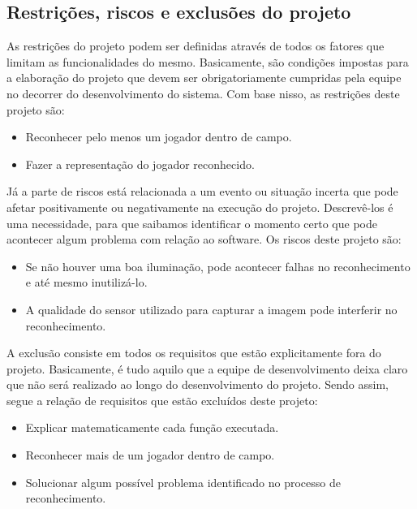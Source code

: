 \subsection{Restrições, riscos e exclusões do projeto}

As restrições do projeto podem ser definidas através de todos os fatores que limitam as funcionalidades do mesmo. Basicamente, são condições impostas para a elaboração do projeto que devem ser obrigatoriamente cumpridas pela equipe no decorrer do desenvolvimento do sistema. Com base nisso, as restrições deste projeto são:

\begin{itemize}
\raggedright \item Reconhecer pelo menos um jogador dentro de campo.
\raggedright \item Fazer a representação do jogador reconhecido.
\end{itemize}

Já a parte de riscos está relacionada a um evento ou situação incerta que pode afetar positivamente ou negativamente na execução do projeto. Descrevê-los é uma necessidade, para que saibamos identificar o momento certo que pode acontecer algum problema com relação ao software. Os riscos deste projeto são:

\begin{itemize}
\raggedright \item Se não houver uma boa iluminação, pode acontecer falhas no reconhecimento e até mesmo inutilizá-lo.
\raggedright \item A qualidade do sensor utilizado para capturar a imagem pode interferir no reconhecimento.
\end{itemize}

A exclusão consiste em todos os requisitos que estão explicitamente fora do projeto. Basicamente, é tudo aquilo que a equipe de desenvolvimento deixa claro que não será realizado ao longo do desenvolvimento do projeto. Sendo assim, segue a relação de requisitos que estão excluídos deste projeto:

\begin{itemize}
\raggedright \item Explicar matematicamente cada função executada.

\raggedright \item Reconhecer mais de um jogador dentro de campo.

\raggedright \item Solucionar algum possível problema identificado no processo de reconhecimento.
\end{itemize}